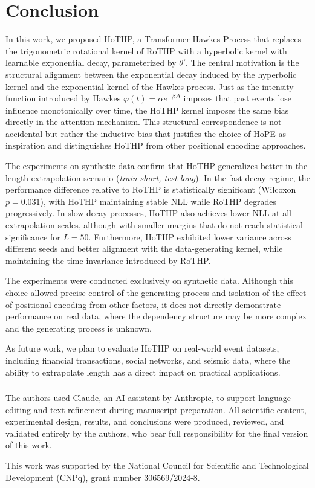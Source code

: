 \documentclass[runningheads]{llncs}
\begin{document}
\section{Conclusion}

In this work, we proposed HoTHP, a Transformer Hawkes Process that replaces the trigonometric rotational kernel of RoTHP with a hyperbolic kernel with learnable exponential decay, parameterized by $\theta'$. The central motivation is the structural alignment between the exponential decay induced by the hyperbolic kernel and the exponential kernel of the Hawkes process. Just as the intensity function introduced by Hawkes \cite{hawkes1971spectra} $\varphi(t) = \alpha e^{-\beta \Delta}$ imposes that past events lose influence monotonically over time, the HoTHP kernel imposes the same bias directly in the attention mechanism. This structural correspondence is not accidental but rather the inductive bias that justifies the choice of HoPE as inspiration and distinguishes HoTHP from other positional encoding approaches.

The experiments on synthetic data confirm that HoTHP generalizes better in the length extrapolation scenario (\textit{train short, test long}). In the fast decay regime, the performance difference relative to RoTHP is statistically significant (Wilcoxon $p=0.031$), with HoTHP maintaining stable NLL while RoTHP degrades progressively. In slow decay processes, HoTHP also achieves lower NLL at all extrapolation scales, although with smaller margins that do not reach statistical significance for $L=50$. Furthermore, HoTHP exhibited lower variance across different seeds and better alignment with the data-generating kernel, while maintaining the time invariance introduced by RoTHP.

The experiments were conducted exclusively on synthetic data. Although this choice allowed precise control of the generating process and isolation of the effect of positional encoding from other factors, it does not directly demonstrate performance on real data, where the dependency structure may be more complex and the generating process is unknown.

As future work, we plan to evaluate HoTHP on real-world event datasets, including financial transactions, social networks, and seismic data, where the ability to extrapolate length has a direct impact on practical applications.

\begin{credits}
\subsubsection{\ackname} 
The authors used Claude, an AI assistant by Anthropic, to support language editing and text refinement during manuscript preparation. All scientific content, experimental design, results, and conclusions were produced, reviewed, and validated entirely by the authors, who bear full responsibility for the final version of this work.

This work was supported by the National Council for Scientific and
Technological Development (CNPq), grant number 306569/2024-8.
\end{credits}


\end{document}
